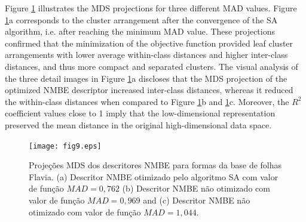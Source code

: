 {Figure \ref{MDS:Leaves} illustrates the MDS projections for three different MAD values. Figure \ref{MDS:Leaves}a corresponds to the cluster arrangement after the convergence of the SA algorithm, i.e. after reaching the minimum MAD value. These projections confirmed that the minimization of the objective function provided leaf cluster arrangements with lower average within-class distances and higher inter-class distances, and thus  more compact and separated clusters. The visual analysis of the three detail images in Figure \ref{MDS:Leaves}a discloses that the MDS projection of the optimized NMBE descriptor increased inter-class distances, whereas it reduced the within-class distances when compared to Figure \ref{MDS:Leaves}b and \ref{MDS:Leaves}c. Moreover, the $R^2$ coefficient values close to 1 imply that the low-dimensional representation preserved the mean distance in the original high-dimensional data space.

\begin{figure}[h!]
 \caption{\label{MDS:Leaves} Projeções MDS dos descritores NMBE para formas da base de folhas Flavia. (a) Descritor NMBE otimizado pelo algoritmo SA com valor de função $MAD = 0,762$ (b) Descritor NMBE não otimizado com valor de função $MAD =0,969$ and (c) Descritor NMBE não otimizado com valor de função $MAD = 1,044$.}

\centering
\texttt{[image: fig9.eps]}
\end{figure}
}
